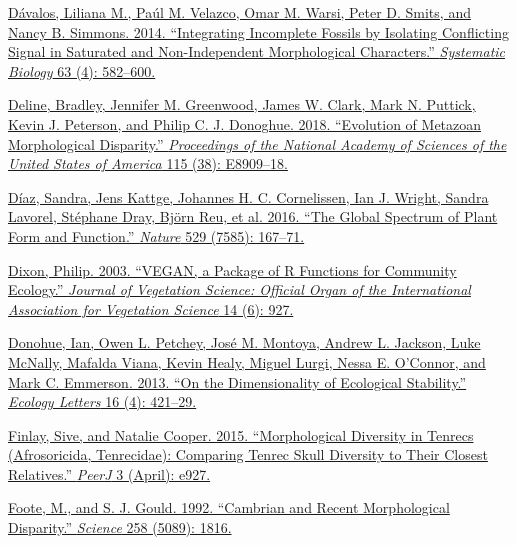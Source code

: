 \href{http://paperpile.com/b/sTGYvp/Qrba}{Dávalos, Liliana M., Paúl M.
Velazco, Omar M. Warsi, Peter D. Smits, and Nancy B. Simmons. 2014.
``Integrating Incomplete Fossils by Isolating Conflicting Signal in
Saturated and Non-Independent Morphological Characters.''
}\href{http://paperpile.com/b/sTGYvp/Qrba}{\emph{Systematic
Biology}}\href{http://paperpile.com/b/sTGYvp/Qrba}{ 63 (4): 582--600.}

\href{http://paperpile.com/b/sTGYvp/0y4V}{Deline, Bradley, Jennifer M.
Greenwood, James W. Clark, Mark N. Puttick, Kevin J. Peterson, and
Philip C. J. Donoghue. 2018. ``Evolution of Metazoan Morphological
Disparity.''
}\href{http://paperpile.com/b/sTGYvp/0y4V}{\emph{Proceedings of the
National Academy of Sciences of the United States of
America}}\href{http://paperpile.com/b/sTGYvp/0y4V}{ 115 (38):
E8909--18.}

\href{http://paperpile.com/b/sTGYvp/47fI}{Díaz, Sandra, Jens Kattge,
Johannes H. C. Cornelissen, Ian J. Wright, Sandra Lavorel, Stéphane
Dray, Björn Reu, et al. 2016. ``The Global Spectrum of Plant Form and
Function.''
}\href{http://paperpile.com/b/sTGYvp/47fI}{\emph{Nature}}\href{http://paperpile.com/b/sTGYvp/47fI}{
529 (7585): 167--71.}

\href{http://paperpile.com/b/sTGYvp/2KmX}{Dixon, Philip. 2003. ``VEGAN,
a Package of R Functions for Community Ecology.''
}\href{http://paperpile.com/b/sTGYvp/2KmX}{\emph{Journal of Vegetation
Science: Official Organ of the International Association for Vegetation
Science}}\href{http://paperpile.com/b/sTGYvp/2KmX}{ 14 (6): 927.}

\href{http://paperpile.com/b/sTGYvp/krNU}{Donohue, Ian, Owen L. Petchey,
José M. Montoya, Andrew L. Jackson, Luke McNally, Mafalda Viana, Kevin
Healy, Miguel Lurgi, Nessa E. O'Connor, and Mark C. Emmerson. 2013. ``On
the Dimensionality of Ecological Stability.''
}\href{http://paperpile.com/b/sTGYvp/krNU}{\emph{Ecology
Letters}}\href{http://paperpile.com/b/sTGYvp/krNU}{ 16 (4): 421--29.}

\href{http://paperpile.com/b/sTGYvp/yyNa}{Finlay, Sive, and Natalie
Cooper. 2015. ``Morphological Diversity in Tenrecs (Afrosoricida,
Tenrecidae): Comparing Tenrec Skull Diversity to Their Closest
Relatives.''
}\href{http://paperpile.com/b/sTGYvp/yyNa}{\emph{PeerJ}}\href{http://paperpile.com/b/sTGYvp/yyNa}{
3 (April): e927.}

\href{http://paperpile.com/b/sTGYvp/oenu}{Foote, M., and S. J. Gould.
1992. ``Cambrian and Recent Morphological Disparity.''
}\href{http://paperpile.com/b/sTGYvp/oenu}{\emph{Science}}\href{http://paperpile.com/b/sTGYvp/oenu}{
258 (5089): 1816.}

